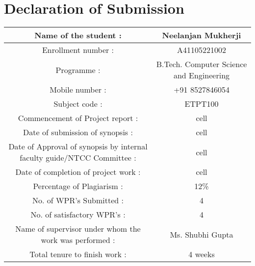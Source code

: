 \chapter*{Declaration of Submission}

\begin{center}
\begin{tabular}{ |c|c| } 
 \hline
 Name of the student : & Neelanjan Mukherji \\ 
 \hline
 Enrollment number : & A41105221002 \\ 
 \hline
 Programme : & B.Tech. Computer Science and Engineering \\ 
 \hline
 Mobile number : & +91 8527846054 \\
 \hline
 Subject code : & ETPT100 \\
 \hline
     Commencement of Project report : & cell \\
 \hline
 Date of submission of synopsis : & cell \\
 \hline
 Date of Approval of synopsis by internal faculty guide/NTCC Committee : & cell \\
 \hline
 Date of completion of project work : & cell \\
 \hline
 Percentage of Plagiarism : & 12\% \\
 \hline
 No. of WPR’s Submitted : & 4 \\
 \hline
 No. of satisfactory WPR’s : & 4 \\
 \hline
 Name of supervisor under whom the work was performed : & Ms. Shubhi Gupta \\
 \hline
 Total tenure to finish work : & 4 weeks \\
 \hline

\end{tabular}
\end{center}